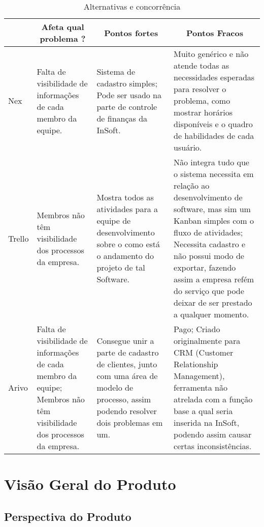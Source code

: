       \begin{table}[H]
        \centering
        \begin{tabular}{|p{}|p{}|p{}|p{}|}
          \hline
          \rowcolor[HTML]{C0C0C0}
          \multicolumn{1}{c}{Produto} & \multicolumn{1}{|c|}{Afeta qual problema ?} & \multicolumn{1}{|c|}{Pontos fortes} & \multicolumn{1}{|c|}{Pontos Fracos} \\ \hline
            Nex
              & Falta de visibilidade de informações de cada membro da equipe.
              & Sistema de cadastro simples;
                Pode ser usado na parte de controle de finanças da InSoft.
              & Muito genérico e não atende todas as necessidades esperadas para resolver o problema, como mostrar horários disponíveis e o quadro de habilidades de cada usuário. \\ \hline
            Trello
              & Membros não têm visibilidade dos processos da empresa.
              & Mostra todos as atividades para a equipe de desenvolvimento sobre o como está o andamento do projeto de tal Software.
              & Não integra tudo que o sistema necessita em relação ao desenvolvimento de software, mas sim um Kanban simples com o fluxo de atividades;
                Necessita cadastro e não possui modo de exportar, fazendo assim a empresa refém do serviço que pode deixar de ser prestado a qualquer momento. \\ \hline
            Arivo
              & Falta de visibilidade de informações de cada membro da equipe;
                Membros não têm visibilidade dos processos da empresa.
              & Consegue unir a parte de cadastro de clientes, junto com uma área de modelo de processo, assim podendo resolver dois problemas em um.
              & Pago;
                Criado originalmente para CRM (Customer Relationship Management), ferramenta não atrelada com a função base a qual seria inserida na InSoft, podendo assim causar certas inconsistências. \\ \hline
        \end{tabular}
        \caption{Alternativas e concorrência}
      \end{table}

  \section{Visão Geral do Produto}

    \subsection{Perspectiva do Produto}

